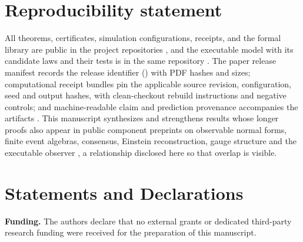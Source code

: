 \documentclass[11pt]{article}
\theoremstyle{definition}
\theoremstyle{remark}
\begin{document}
\section*{Reproducibility statement}

All theorems, certificates, simulation configurations, receipts, and the
formal library are public in the project repositories \cite{ophrepo,ophsim},
and the executable model with its candidate laws and their tests is in the
same repository \cite{ophmodel}.
The paper release manifest records the release identifier
(\OPHPaperReleaseID) with PDF hashes and sizes; computational receipt bundles
pin the applicable source revision, configuration, seed and output hashes,
with clean-checkout rebuild instructions and negative controls; and
machine-readable claim and prediction provenance accompanies the artifacts
\cite{ophregister}. This manuscript synthesizes and strengthens results whose
longer proofs also appear in public component preprints on observable normal
forms, finite event algebras, consensus, Einstein reconstruction, gauge
structure and the executable observer
\cite{ophnormalforms,opheventalgebra,ophconsensus,ophEinstein,ophGauge,ophspine},
a relationship disclosed here so that overlap is visible.

\section*{Statements and Declarations}

\noindent\textbf{Funding.}
The authors declare that no external grants or dedicated third-party research
funding were received for the preparation of this manuscript.
\end{document}
